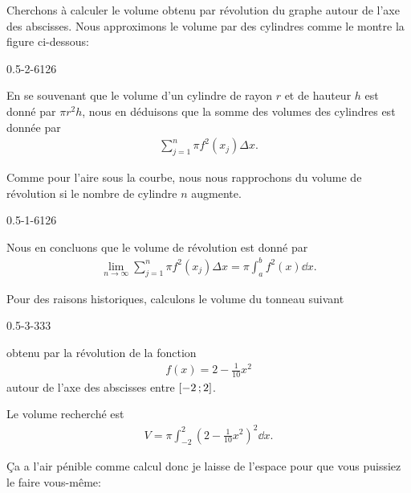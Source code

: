 \documentclass[main.tex]{subfiles}
\begin{document}
Cherchons à calculer le volume obtenu par révolution du graphe autour de l'axe des abscisses.
Nous approximons le volume par des cylindres comme le montre la figure ci-dessous:
\begin{plot}
    {0.5}{-2}{-6}{12}{6}
\end{plot}

En se souvenant que le volume d'un cylindre de rayon $r$ et de hauteur $h$ est donné par $\pi r^2 h$,
nous en déduisons que la somme des volumes des cylindres est donnée par
\begin{align}
    \sum_{j = 1}^n \pi f^2(x_j) \Delta x.
\end{align}

Comme pour l'aire sous la courbe,
nous nous rapprochons du volume de révolution si le nombre de cylindre $n$ augmente.
\begin{plot}
    {0.5}{-1}{-6}{12}{6}
\end{plot}

Nous en concluons que le volume de révolution est donné par
\begin{align}
    \lim_{n \to \infty} \sum_{j = 1}^n \pi f^2(x_j) \Delta x
    = \pi \int_a^b f^2(x) \dd x.
\end{align}

\begin{example}

    Pour des raisons historiques,
    calculons le volume du tonneau suivant
    \begin{plot}
        {0.5}{-3}{-3}{3}{3}
    \end{plot}
    obtenu par la révolution de la fonction
    \begin{align}
        f(x) = 2 -\frac 1 {10} x^2
    \end{align}
    autour de l'axe des abscisses entre $\mathopen{[}-2\,;2\mathclose{]}$.

    Le volume recherché est
    \begin{align}
        V = \pi \int_{-2}^2 \left(2 - \frac 1 {10} x^2\right)^2 \dd x.
    \end{align}

    Ça a l'air pénible comme calcul donc je laisse de l'espace pour que vous puissiez le faire vous-même:

    \vspace{10cm}
\end{example}
\end{document}
